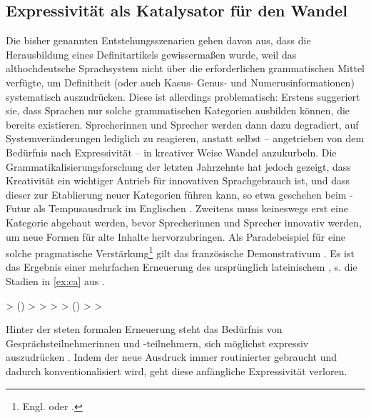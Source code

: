 \subsection{Expressivität als Katalysator für den Wandel} \label{sec:kata}

Die bisher genannten Entstehungsszenarien gehen davon aus, dass die Herausbildung eines Definitartikels gewissermaßen  wurde, weil das althochdeutsche Sprachsystem nicht über die erforderlichen grammatischen Mittel verfügte, um Definitheit (oder auch Kasus- Genus- und Numerusinformationen) systematisch auszudrücken. Diese  ist allerdings problematisch: Erstens suggeriert sie, dass Sprachen nur solche grammatischen Kategorien ausbilden können, die bereits existieren. Sprecherinnen und Sprecher werden dann dazu degradiert, auf Systemveränderungen lediglich zu reagieren, anstatt selbst -- angetrieben von dem Bedürfnis nach Expressivität -- in kreativer Weise Wandel anzukurbeln. Die Grammatikalisierungsforschung der letzten Jahrzehnte hat jedoch gezeigt, dass Kreativität ein wichtiger Antrieb für innovativen Sprachgebrauch ist, und dass dieser zur Etablierung neuer Kategorien führen kann, so etwa geschehen beim -Futur als Tempusausdruck im Englischen \parencite[s. z.B.][30ff]{Heine1991}. Zweitens muss keineswegs erst eine Kategorie abgebaut werden, bevor Sprecherinnen und Sprecher innovativ werden, um neue Formen für alte Inhalte hervorzubringen. Als Paradebeispiel für eine solche pragmatische Verstärkung\footnote{Engl.  oder  \parencite[s.][94]{Hopper2006}.} gilt das französische Demonstrativum . Es ist das Ergebnis einer mehrfachen Erneuerung des ursprünglich lateinischem , s. die Stadien in \ref{ex:ca} aus \textcite[94]{Hopper2006}. 

\begin{exe}
	\ex \label{ex:ca}   > ()    >  >  >  > ()  >  > 
\end{exe}

Hinter der steten formalen Erneuerung steht das Bedürfnis von Gesprächsteilnehmerinnen und -teilnehmern, sich möglichst expressiv auszudrücken \parencites[179]{Detges2002}[73]{Hopper2006}[176]{Lehmann2015}. Indem der neue Ausdruck immer routinierter gebraucht und dadurch konventionalisiert wird, geht diese anfängliche Expressivität verloren. 

